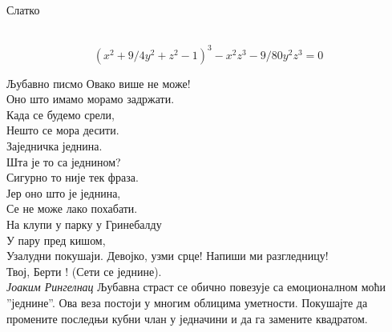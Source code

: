 \documentclass[en]{./../../common/SurferDesc}%
\begin{document}
\footnotesize


\begin{surferPage}
  \begin{surferTitle}Слатко\end{surferTitle}   \\

\smallskip
\[(x^2+ 9/4y^2	+ z^2- 1)^3- x^2z^3	- 9/80y^2z^3	= 0\]

\singlespacing
Љубавно писмо
\singlespacing
Овако више не може!\\
Оно што имамо морамо задржати.\\
Када се будемо срели,\\
Нешто се мора десити.\\
Заједничка једнина.\\
Шта је то са једнином?\\
Сигурно то није тек фраза.\\
Јер оно што је једнина,\\
Се не може лако похабати.\\
На клупи у парку у Гринебалду\\
У пару пред кишом,\\
Узалудни покушаји. Девојко, узми срце! Напиши ми разгледницу!\\
Твој, Берти ! (Сети се једнине).\\
{\it Јоаким Рингелнац}
\singlespacing 
Љубавна страст се обично повезује са емоционалном моћи ''једнине''. Ова веза постоји у многим облицима уметности.
\singlespacing 
Покушајте да промените последњи кубни члан у једначини и да га замените квадратом.



  \begin{surferText}
     \end{surferText}
\end{surferPage}
\end{document}
